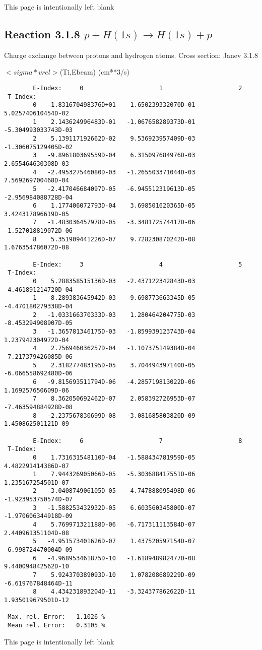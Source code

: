 \documentclass[12pt]{article}
\begin{document}
\newpage
This page is intentionally left blank
\newpage

\subsection{
Reaction 3.1.8  $ p + H(1s) \rightarrow H(1s) + p   $
}

 Charge exchange between protons and hydrogen
 atoms. Cross section: Janev  3.1.8

$ <sigma*vrel>$(Ti,Ebeam)  (cm**3/s)

\begin{small}\begin{verbatim}
        E-Index:     0                     1                     2
 T-Index:
        0   -1.831670498376D+01    1.650239332070D-01    5.025740610454D-02
        1    2.143624996483D-01   -1.067658289373D-01   -5.304993033743D-03
        2    5.139117192662D-02    9.536923957409D-03   -1.306075129405D-02
        3   -9.896180369559D-04    6.315097684976D-03    2.655464630308D-03
        4   -2.495327546080D-03   -1.265503371044D-03    7.569269700468D-04
        5   -2.417046684097D-05   -6.945512319613D-05   -2.956984088728D-04
        6    1.177406072793D-04    3.698501620365D-05    3.424317896619D-05
        7   -1.483036457978D-05   -3.348172574417D-06   -1.527018819072D-06
        8    5.351909441226D-07    9.728230870242D-08    1.676354786072D-08

        E-Index:     3                     4                     5
 T-Index:
        0    5.288358515136D-03   -2.437122342843D-03   -4.461891214720D-04
        1    8.289383645942D-03   -9.698773663345D-05   -4.470180279338D-04
        2   -1.033166370333D-03    1.280464204775D-03   -8.453294908907D-05
        3   -1.365781346175D-03   -1.859939123743D-04    1.237942304972D-04
        4    2.756946036257D-04   -1.107375149384D-04   -7.217379426085D-06
        5    2.318277483195D-05    3.704494397140D-05   -6.066558692480D-06
        6   -9.815693511794D-06   -4.285719813022D-06    1.169257650609D-06
        7    8.362050692462D-07    2.058392726953D-07   -7.463594884928D-08
        8   -2.237567830699D-08   -3.081685803820D-09    1.450862501121D-09

        E-Index:     6                     7                     8
 T-Index:
        0    1.731631548110D-04   -1.588434781959D-05    4.482291414386D-07
        1    7.944326905066D-05   -5.303688417551D-06    1.235167254501D-07
        2   -3.040874906105D-05    4.747888095498D-06   -1.923953750574D-07
        3   -1.588253432932D-05    6.603560345800D-07   -1.970606344918D-09
        4    5.769971321188D-06   -6.717311113584D-07    2.440961351104D-08
        5   -4.951573401626D-07    1.437520597154D-07   -6.998724470004D-09
        6   -4.968953461875D-10   -1.618948982477D-08    9.440094842562D-10
        7    5.924370389093D-10    1.078208689229D-09   -6.619767848464D-11
        8    4.434231893204D-11   -3.324377862622D-11    1.935019679501D-12

 Max. rel. Error:   1.1026 %
 Mean rel. Error:   0.3105 %

\end{verbatim}\end{small}
\newpage
This page is intentionally left blank
\newpage
\end{document}
